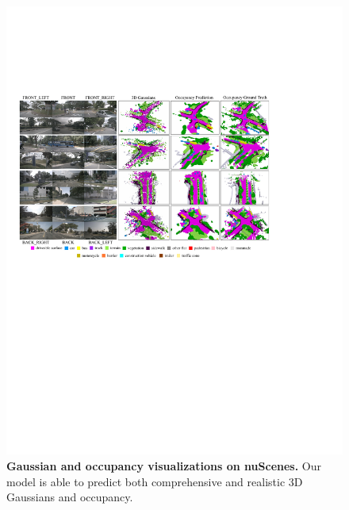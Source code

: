 \begin{figure}[t]
\centering
\includegraphics[width=0.95\linewidth]{figures/vis_main.pdf}
\vspace{-2mm}
\caption{\textbf{Gaussian and occupancy visualizations on nuScenes.}
Our model is able to predict both comprehensive and realistic 3D Gaussians and occupancy.
}
\label{fig:main}
\vspace{-6mm}
\end{figure}



